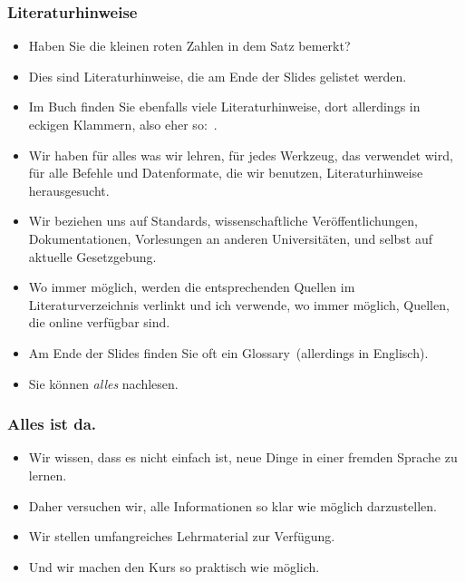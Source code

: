 \documentclass[aspectratio=169,mathserif,notheorems]{beamer}%
\begin{document}
%
\begin{frame}%
\frametitle{Literaturhinweise}%
\begin{itemize}%
\item Haben Sie die kleinen roten Zahlen in dem Satz \emph{} bemerkt?%
\item<2-> Dies sind Literaturhinweise, die am Ende der Slides gelistet werden.%
\item<3-> Im Buch \cite{programmingWithPython} finden Sie ebenfalls viele Literaturhinweise, dort allerdings in eckigen Klammern, also eher so:~.%
\item<4-> Wir haben für alles was wir lehren, für jedes Werkzeug, das verwendet wird, für alle Befehle und Datenformate, die wir benutzen, Literaturhinweise herausgesucht.%
\item<5-> Wir beziehen uns auf Standards, wissenschaftliche Veröffentlichungen, Dokumentationen, Vorlesungen an anderen Universitäten, und selbst auf aktuelle Gesetzgebung.%
\item<6-> Wo immer möglich, werden die entsprechenden Quellen im Literaturverzeichnis verlinkt und ich verwende, wo immer möglich, Quellen, die online verfügbar sind.%
\item<7-> Am Ende der Slides finden Sie oft ein Glossary~(allerdings in Englisch).%
\item<8-> Sie können \emph{alles} nachlesen.%
\end{itemize}%
\end{frame}%
%
\begin{frame}%
\frametitle{Alles ist da.}%
\begin{itemize}%
\item Wir wissen, dass es nicht einfach ist, neue Dinge in einer fremden Sprache zu lernen.%
\item<2-> Daher versuchen wir, alle Informationen so klar wie möglich darzustellen.%
\item<3-> Wir stellen umfangreiches Lehrmaterial zur Verfügung.%
\item<4-> Und wir machen den Kurs so praktisch wie möglich.%
\end{itemize}%
\end{frame}%
%
\end{document}
